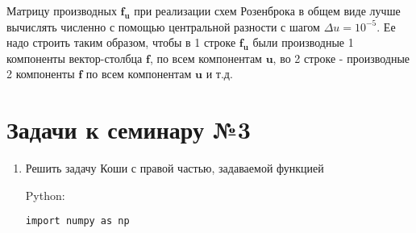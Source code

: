\documentclass{article}
\begin{document}
Матрицу производных $\mathbf{f_u}$ при реализации схем Розенброка в общем виде лучше вычислять численно с помощью центральной разности с шагом $\Delta u = 10^{-5}$. Ее надо строить таким образом, чтобы в 1 строке $\mathbf{f_u}$ были производные 1 компоненты вектор-столбца $\mathbf{f}$, по всем компонентам $\mathbf{u}$, во 2 строке - производные 2 компоненты $\mathbf{f}$ по всем компонентам $\mathbf{u}$ и т.д.

\newpage

\section*{Задачи к семинару №3}
\begin{enumerate}
\item Решить задачу Коши с правой частью, задаваемой функцией  

Python:
\begin{verbatim}
import numpy as np


\end{verbatim}
\end{enumerate}
\end{document}
